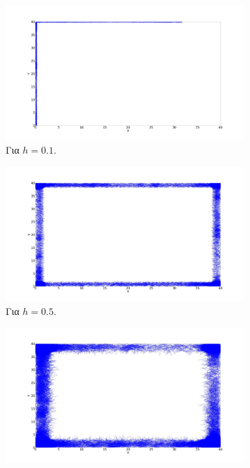 \begin{figure}[ht]
\centering
\begin{subfigure}[b]{0.55\textwidth}
	\centering
	\includegraphics[width=\textwidth]{LateX images/log/h/g1-2.1}
	\caption{Για $h =0.1$.}
	\label{f:g104}
\end{subfigure}
\hfill
\begin{subfigure}[b]{0.55\textwidth}
	\centering
	\includegraphics[width=\textwidth]{LateX images/log/h/g2-2.1}
	\caption{Για $h =0.5$.}
	\label{f:g105}
\end{subfigure}
\hfill
\begin{subfigure}[b]{0.55\textwidth}
	\centering
	\includegraphics[width=\textwidth]{LateX images/log/h/g3-2.1}

\end{subfigure}
\end{figure}
